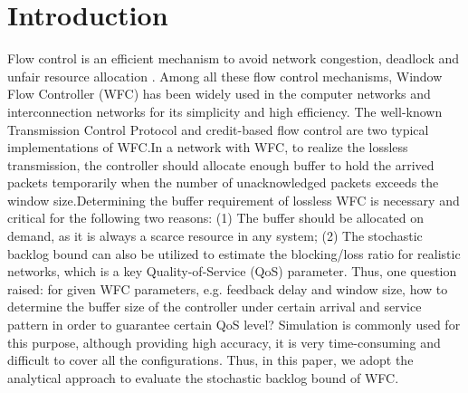 \documentclass[12pt]{article}
\begin{document}
\section{Introduction}
Flow control is an efficient mechanism to avoid network congestion, deadlock and unfair resource allocation \cite{1094691}. Among all these flow control mechanisms, Window Flow Controller (WFC) has been widely used in the computer networks and interconnection networks for its simplicity and high efficiency. The well-known Transmission Control Protocol \cite{RFC5681} and credit-based flow control \cite{372658,DaTo04} are two typical implementations of WFC.\@ In a network with WFC, to realize the lossless transmission, the controller should allocate enough buffer to hold the arrived packets temporarily when the number of unacknowledged packets exceeds the window size.\@ Determining the buffer requirement of lossless WFC is necessary and critical for the following two reasons: (1) The buffer should be allocated on demand, as it is always a scarce resource in any system; (2) The stochastic backlog bound can also be utilized to estimate the blocking/loss ratio for realistic networks, which is a key Quality-of-Service (QoS) parameter. Thus, one question raised: for given WFC parameters, e.g. feedback delay and window size, how to determine the buffer size of the controller under certain arrival and service pattern in order to guarantee certain QoS level? Simulation is commonly used for this purpose, although providing high accuracy, it is very time-consuming and difficult to cover all the configurations. Thus, in this paper, we adopt the analytical approach to evaluate the stochastic backlog bound of WFC.
\end{document}
